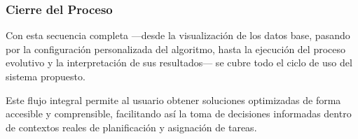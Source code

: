 \subsubsection*{Cierre del Proceso}

Con esta secuencia completa —desde la visualización de los datos base, pasando por la configuración personalizada del algoritmo, hasta la ejecución del proceso evolutivo y la interpretación de sus resultados— se cubre todo el ciclo de uso del sistema propuesto.

Este flujo integral permite al usuario obtener soluciones optimizadas de forma accesible y comprensible, facilitando así la toma de decisiones informadas dentro de contextos reales de planificación y asignación de tareas.








